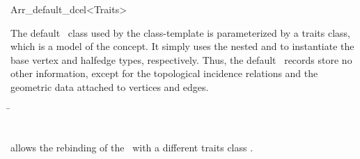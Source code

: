 
\ccRefPageBegin

\begin{ccRefClass}{Arr_default_dcel<Traits>}

\ccDefinition

The default \dcel\ class used by the  class-template
is parameterized by a traits class, which is a model of the
 concept. It simply uses the nested
 and  to instantiate
the base vertex and halfedge types, respectively. Thus, the default
\dcel\ records store no other information, except for the topological
incidence relations and the geometric data attached to vertices and edges.


\ccIsModel

\ccInheritsFrom
  \begin{tabbing}
    \= \\
                        \>\\
                        \>
  \end{tabbing}

\ccTypes

   {allows the rebinding of the \dcel\ with a different traits class .}

\ccSeeAlso


\end{ccRefClass}

\ccRefPageEnd
